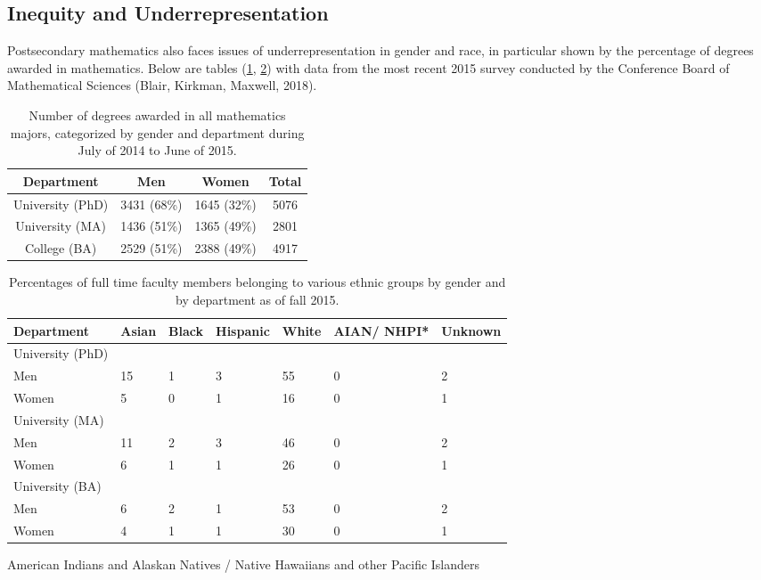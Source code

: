 \subsection{Inequity and Underrepresentation}
Postsecondary mathematics also faces issues of underrepresentation in gender and race, in particular shown by the percentage of degrees awarded in mathematics. Below are tables (\ref{table:gender}, \ref{table:race}) with data from the most recent 2015 survey conducted by the Conference Board of Mathematical Sciences (Blair, Kirkman, Maxwell, 2018).
\begin{table}[htb]
  \begin{center}
    \begin{tabular}{c | c | c | c}
      Department & Men & Women & Total\\ \hline
      University (PhD) & 3431 (68\%) & 1645 (32\%) & 5076\\
      University (MA) & 1436 (51\%) & 1365 (49\%) & 2801\\
      College (BA) & 2529 (51\%) & 2388 (49\%) & 4917
    \end{tabular}
  \end{center}
  \caption{Number of degrees awarded in all mathematics majors, categorized by gender and department during July of 2014 to June of 2015.}
  \label{table:gender}
\end{table}

\begin{table}[htb]
  \begin{center}
    \begin{tabular}{l | l | l | l | l | p{1.2cm} | l}
      Department & Asian & Black & Hispanic & White & AIAN/ NHPI* & Unknown\\ \hline
      University (PhD)&&&&&\\
      Men & 15 & 1 & 3 & 55 & 0 & 2\\
      Women & 5 & 0 & 1 & 16 & 0 & 1\\ \hline
      University (MA)&&&&&\\
      Men & 11 & 2 & 3 & 46 & 0 & 2\\
      Women & 6 & 1 & 1 & 26 & 0 & 1\\ \hline
      University (BA)&&&&&\\
      Men & 6 & 2 & 1 & 53 & 0 & 2\\
      Women & 4 & 1 & 1 & 30 & 0 & 1
    \end{tabular}
  \end{center}
  {\footnotesize *American Indians and Alaskan Natives / Native Hawaiians and other Pacific Islanders}
  \caption{Percentages of full time faculty members belonging to various ethnic groups by gender and by department as of fall 2015.}
  \label{table:race}
\end{table}



